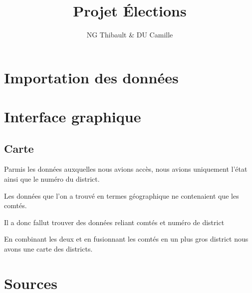 \documentclass{article}
\title{\textbf{\huge{Projet Élections}}}
\author{NG Thibault \& DU Camille}
\begin{document}
    \maketitle

    \newpage
    \tableofcontents

    \newpage
    \section{Importation des données}



    \newpage
    \section{Interface graphique}

    \subsection{Carte}

    Parmis les données auxquelles nous avions accès, nous avions uniquement l'état ainsi que le numéro du district.

    Les données que l'on a trouvé en termes géographique ne contenaient que les comtés.

    Il a donc fallut trouver des données reliant comtés et numéro de district

    En combinant les deux et en fusionnant les comtés en un plus gros district nous avons une carte des districts.




    \section{Sources}\label{sec:sources}



    \nocite{*}
    
    
\end{document}
